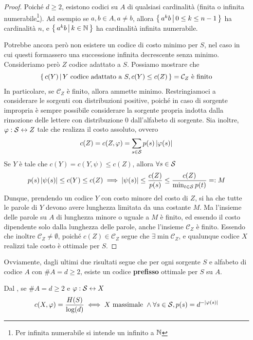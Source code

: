 \begin{proof}
  Poiché \(d \geq 2\), esistono codici su \(A\) di qualsiasi cardinalità (finita o infinita numerabile\footnote{Per infinita numerabile si intende un infinito  a \(\mathbb{N}\)}).
  Ad esempio se \(a,b \in A, a \neq b\), allora \(\set{a^k b}[0 \leq k \leq n-1]\) ha cardinalità \(n\), e \(\set{a^k b}[k \in \N]\) ha cardinalità infinita numerabile.

  Potrebbe ancora però non esistere un codice di costo minimo per \(S\), nel caso in cui questi formassero una successione infinita decrescente senza minimo.
  Consideriamo però \(Z\) codice adattato a \(S\). Possiamo mostrare che
  \[\set{c(Y)}[Y \text{ codice adattato a } S, c(Y)\leq c(Z)] = \mathcal{C}_Z \text{ è finito}\]
  In particolare, se \(\mathcal{C}_Z\) è finito, allora ammette minimo.
  Restringiamoci a considerare le sorgenti con distribuzioni positive, poiché in caso di sorgente impropria è sempre possibile considerare la sorgente propria indotta dalla rimozione delle lettere con distribuzione \(0\) dall'alfabeto di sorgente.
  Sia inoltre, \(\varphi: \mathcal{S} \leftrightarrow Z\) tale che realizza il costo assoluto, ovvero
  \[c(Z) = c(Z,\varphi) = \sum_{s \in \mathcal{S}} p(s)\left|\varphi(s)\right|\]
  Se \(Y\) è tale che \(c(Y) = c(Y,\psi) \leq c(Z)\), allora \(\forall s \in \mathcal{S}\)
  \[p(s)\left|\psi(s)\right| \leq c(Y) \leq c(Z) \implies \left|\psi(s)\right| \leq \frac{c(Z)}{p(s)} \leq \frac{c(Z)}{\min_{t \in \mathcal{S}} p(t)} =: M\]
  Dunque, prendendo un codice \(Y\) con costo minore del costo di \(Z\), si ha che tutte le parole di \(Y\) devono avere lunghezza limitata da una costante \(M\).
  Ma l'insieme delle parole su \(A\) di lunghezza minore o uguale a \(M\) è finito, ed essendo il costo dipendente solo dalla lunghezza delle parole, anche l'insieme \(\mathcal{C}_Z\) è finito.
  Essendo che inoltre \(\mathcal{C}_Z\neq \emptyset\), poiché \(c(Z) \in \mathcal{C}_Z\) segue che \(\exists \min \mathcal{C}_Z\), e qualunque codice \(X\) realizzi tale costo è ottimale per \(S\).
\end{proof}

\begin{observation}{}
  Ovviamente, dagli ultimi due risultati segue che per ogni sorgente \(S\) e alfabeto di codice \(A\) con \(\# A = d \geq 2\), esiste un codice \textbf{prefisso} ottimale per \(S\) su \(A\).
\end{observation}

Dal , se \(\#A = d \geq 2\) e \(\varphi: \mathcal{S} \leftrightarrow X\)
\[c(X,\varphi) = \frac{H(S)}{\log(d)} \iff X \text{ massimale } \land \forall s \in \mathcal{S}, p(s)=d^{-\left|\varphi(s)\right|}\]

